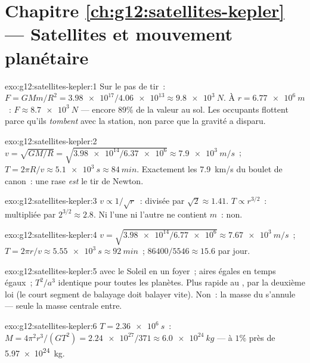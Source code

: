 \section*{Chapitre \ref{ch:g12:satellites-kepler} --- Satellites et mouvement planétaire}

\begin{solution}{exo:g12:satellites-kepler:1}
Sur le pas de tir~: $F = GMm/R^2 = \num{3.98e17}/\num{4.06e13} \approx
\qty{9.8e3}{N}$. À $r = \qty{6.77e6}{m}$~:
$F \approx \qty{8.7e3}{N}$ --- encore $89\%$ de la valeur au sol. Les
occupants flottent parce qu'ils \emph{tombent} avec la station, non
parce que la gravité a disparu.
\end{solution}

\begin{solution}{exo:g12:satellites-kepler:2}
$v = \sqrt{GM/R} = \sqrt{\num{3.98e14}/\num{6.37e6}} \approx
\qty{7.9e3}{m/s}$~; $T = 2\pi R/v \approx \qty{5.1e3}{s} \approx
\qty{84}{min}$. Exactement les \qty{7.9}{km/s} du boulet de canon~: une
 rase \emph{est} le tir de Newton.
\end{solution}

\begin{solution}{exo:g12:satellites-kepler:3}
$v \propto 1/\sqrt{r}$~: divisée par $\sqrt 2 \approx 1.41$.
$T \propto r^{3/2}$~: multipliée par $2^{3/2} \approx 2.8$. Ni l'une ni
l'autre ne contient $m$~: non.
\end{solution}

\begin{solution}{exo:g12:satellites-kepler:4}
$v = \sqrt{\num{3.98e14}/\num{6.77e6}} \approx \qty{7.67e3}{m/s}$~;
$T = 2\pi r/v \approx \qty{5.55e3}{s} \approx \qty{92}{min}$~;
$\num{86400}/5546 \approx 15.6$  par jour.
\end{solution}

\begin{solution}{exo:g12:satellites-kepler:5}
 avec le Soleil en un foyer~; aires égales en temps
égaux~; $T^2/a^3$ identique pour toutes les planètes. Plus rapide au
, par la deuxième loi (le court segment de balayage
doit balayer vite). Non~: la masse du 
s'annule --- seule la masse centrale entre.
\end{solution}

\begin{solution}{exo:g12:satellites-kepler:6}
$T = \qty{2.36e6}{s}$~: $M = 4\pi^2 r^3/(GT^2) =
\num{2.24e27}/371 \approx \qty{6.0e24}{kg}$ --- à $1\%$ près de
\qty{5.97e24}{kg}.
\end{solution}

